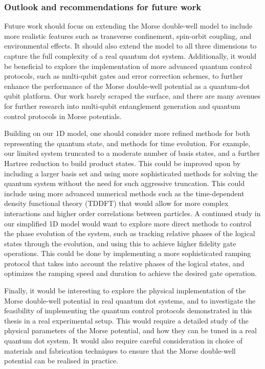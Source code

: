 \documentclass{subfiles}
\begin{document}
\subsubsection*{Outlook and recommendations for future work}
Future work should focus on extending the Morse double-well model to include more realistic features such as transverse confinement, spin-orbit coupling, and environmental effects. It should also extend the model to all three dimensions to capture the full complexity of a real quantum dot system. Additionally, it would be beneficial to explore the implementation of more advanced quantum control protocols, such as multi-qubit gates and error correction schemes, to further enhance the performance of the Morse double-well potential as a quantum-dot qubit platform. Our work barely scraped the surface, and there are many avenues for further research into multi-qubit entanglement generation and quantum control protocols in Morse potentials. 

Building on our 1D model, one should consider more refined methods for both representing the quantum state, and methods for time evolution. For example, our limited system truncated to a moderate number of basis states, and a further Hartree reduction to build product states. This could be improved upon by including a larger basis set and using more sophisticated methods for solving the quantum system without the need for such aggressive truncation. This could include using more advanced numerical methods such as the time-dependent density functional theory (TDDFT) that would allow for more complex interactions and higher order correlations between particles. A continued study in our simplified 1D model would want to explore more direct methods to control the phase evolution of the system, such as tracking relative phases of the logical states through the evolution, and using this to achieve higher fidelity gate operations. This could be done by implementing a more sophisticated ramping protocol that takes into account the relative phases of the logical states, and optimizes the ramping speed and duration to achieve the desired gate operation.

Finally, it would be interesting to explore the physical implementation of the Morse double-well potential in real quantum dot systems, and to investigate the feasibility of implementing the quantum control protocols demonstrated in this thesis in a real experimental setup. This would require a detailed study of the physical parameters of the Morse potential, and how they can be tuned in a real quantum dot system. It would also require careful consideration in choice of materials and fabrication techniques to ensure that the Morse double-well potential can be realised in practice.
\end{document}

